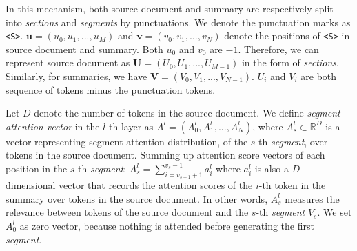 
In this mechanism, both source document and summary are 
respectively split into 
\textit{sections} and \textit{segments} by punctuations. We
denote the punctuation marks as \verb#<S>#.
$\mathbf{u}=(u_{0},u_{1},...,u_{M})$ 
and $\mathbf{v}=(v_{0},v_{1},...,v_{N})$
denote the positions of \verb#<S># in source document and summary.
Both $u_{0}$ and $v_{0}$ are $-1$.
Therefore, we can represent source document as $\mathbf{U}=(U_{0},U_{1},...,U_{M-1})$ in the form of \textit{sections}. Similarly, for summaries, we have $\mathbf{V}=(V_{0},V_{1},...,V_{N-1})$. 
$U_i$ and $V_i$ are
both sequence of tokens minus the punctuation tokens.

Let $D$ denote the number of tokens in the source document.
We define \textit{segment attention vector} in the $l$-th layer as 
$A^{l} = (A_{0}^{l}, A_{1}^{l},..., A_{N}^{l})$, 
where $A_s^l\subset \mathbb{R}^{D}$ is a vector representing 
segment attention distribution, of the $s$-th \textit{segment},
over tokens in the source document. Summing up attention score vectors 
of each position in the $s$-th \textit{segment}:
$A_{s}^{l} = \sum_{i=v_{s-1}+1}^{v_{s}-1}a_{i}^{l}$ where
$a_i^l$ is also a $D$-dimensional vector that records 
the attention scores of the $i$-th token in the summary over 
tokens in the source document. In other words, $ A_{s}^{l}$ 
measures the relevance between tokens of the source document and 
the $s$-th \textit{segment} $V_s$. 
We set $A_{0}^{l}$ as zero vector, because nothing is attended before generating 
the first \textit{segment}. 


